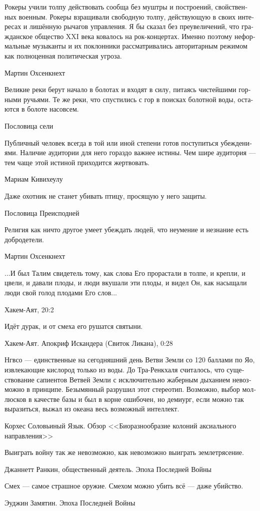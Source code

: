 \documentclass[a4paper,12pt,fleqn]{book}\usepackage{polyglossia}\setdefaultlanguage[babelshorthands=true]{russian}\setotherlanguage{english}\defaultfontfeatures{Ligatures=TeX,Mapping=tex-text}\usepackage{xcolor}\newcommand{\ml}[3]{#2}
\begin{document}
{\epigraph
{Рокеры учили толпу действовать сообща без муштры и построений, свойственных военным.
Рокеры взращивали свободную толпу, действующую в своих интересах и лишённую рычагов управления.
Я бы сказал без преувеличений, что гражданское общество XXI века ковалось на рок-концертах.
Именно поэтому неформальные музыканты и их поклонники рассматривались авторитарным режимом как полноценная политическая угроза.}
{Мартин Охсенкнехт}

\epigraph
{Великие реки берут начало в болотах и входят в силу, питаясь чистейшими горными ручьями.
Те же реки, что спустились с гор в поисках болотной воды, остаются в болоте насовсем.}
{Пословица сели}

\epigraph
{Публичный человек всегда в той или иной степени готов поступиться убеждениями.
Наличие аудитории для него гораздо важнее истины.
Чем шире аудитория --- тем чаще этой истиной приходится жертвовать.}
{Мариам Кивихеулу}

\epigraph
{Даже охотник не станет убивать птицу, просящую у него защиты.}
{Пословица Преисподней}

\epigraph{
\ml{$0$}
{Религия как ничто другое умеет убеждать людей, что неумение и незнание есть добродетели.}
{Religion like nothing else can convince people that there's a virtue in ignorance and inexperience.}
}{
Мартин Охсенкнехт
}

\epigraph
{...И был Талим свидетель тому, как слова Его прорастали в толпе, и крепли, и цвели, и давали плоды, и люди вкушали эти плоды, и видел Он, как насыщали люди свой голод плодами Его слов...}
{Хакем-Аят, 20:2}

\epigraph
{Идёт дурак, и от смеха его рушатся святыни.}
{Хакем-Аят. Апокриф Искандера (Свиток Ликана), 0:28}

\epigraph
{Нгвсо --- единственные на сегодняшний день Ветви Земли со 120 баллами по Яо, извлекающие кислород только из воды.
До Тра-Ренкхаля считалось, что существование сапиентов Ветвей Земли с исключительно жаберным дыханием невозможно в принципе.
Безымянный разрушил этот стереотип.
Возможно, выбор моллюсков в качестве базы и был в корне ошибочен, но демиург, если можно так выразиться, выжал из океана весь возможный интеллект.}
{Корхес Соловьиный Язык.
Обзор <<Биоразнообразие колоний аксиального направления>>}

\epigraph
{Выиграть войну так же невозможно, как невозможно выиграть землетрясение.}
{Джаннетт Ранкин, общественный деятель.
Эпоха Последней Войны}

\epigraph
{Смех --- самое страшное оружие.
Смехом можно убить всё --- даже убийство.}
{Эуджин Замятин.
Эпоха Последней Войны}

}
\end{document}
